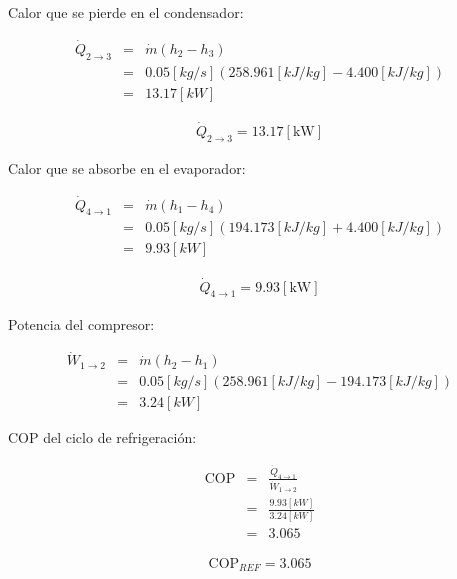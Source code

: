 \documentclass[letter,10pt]{article}
\begin{document}
\begin{enumerate}
Calor que se pierde en el condensador:

\begin{eqnarray*}
    \dot{Q}_{2\rightarrow3} &=& \dot{m}(h_2 - h_3) \\
                            &=& 0.05[kg/s](258.961[kJ/kg]-4.400[kJ/kg]) \\
                            &=& 13.17[kW]
\end{eqnarray*}

\begin{equation*}
\boxed{
    \begin{array}{l}
        \dot{Q}_{2\rightarrow3} = 13.17[\text{kW}]
    \end{array}
}
\end{equation*}

Calor que se absorbe en el evaporador:

\begin{eqnarray*}
    \dot{Q}_{4\rightarrow1} &=& \dot{m}(h_1 - h_4) \\
                            &=& 0.05[kg/s](194.173[kJ/kg]+4.400[kJ/kg]) \\
                            &=& 9.93[kW]
\end{eqnarray*}

\begin{equation*}
\boxed{
    \begin{array}{l}
        \dot{Q}_{4\rightarrow1} = 9.93[\text{kW}]
    \end{array}
}
\end{equation*}

Potencia del compresor:

\begin{eqnarray*}
    \dot{W}_{1\rightarrow2} &=& \dot{m}(h_2 - h_1) \\
                            &=& 0.05[kg/s](258.961[kJ/kg]-194.173[kJ/kg]) \\
                            &=& 3.24[kW]
\end{eqnarray*}

COP del ciclo de refrigeración:

\begin{eqnarray*}
    \text{COP} &=& \frac{\dot{Q}_{4\rightarrow1}}{\dot{W}_{1\rightarrow2}} \\
               &=& \frac{9.93[kW]}{3.24[kW]} \\
               &=& 3.065
\end{eqnarray*}

\begin{equation*}
\boxed{
    \begin{array}{l}
        \text{COP}_{REF} = 3.065
    \end{array}
}
\end{equation*}


\end{enumerate}
\end{document}
